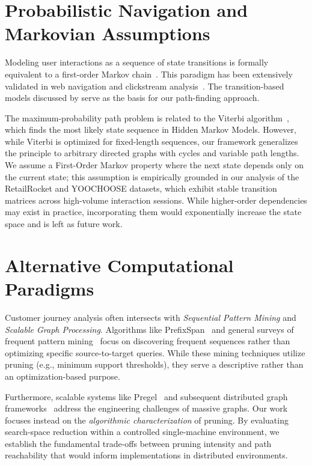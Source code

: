 \section{Probabilistic Navigation and Markovian Assumptions}

Modeling user interactions as a sequence of state transitions is formally equivalent to a first-order Markov chain~\citep{norris1998markov}. This paradigm has been extensively validated in web navigation and clickstream analysis~\citep{bucklin2003clickstream, liu2011webmining}. The transition-based models discussed by \citet{resnick1997recommender} serve as the basis for our path-finding approach.

The maximum-probability path problem is related to the Viterbi algorithm~\citep{viterbi1967error, rabiner1989hmm}, which finds the most likely state sequence in Hidden Markov Models. However, while Viterbi is optimized for fixed-length sequences, our framework generalizes the principle to arbitrary directed graphs with cycles and variable path lengths. We assume a First-Order Markov property where the next state depends only on the current state; this assumption is empirically grounded in our analysis of the RetailRocket and YOOCHOOSE datasets, which exhibit stable transition matrices across high-volume interaction sessions. While higher-order dependencies may exist in practice, incorporating them would exponentially increase the state space and is left as future work.

\section{Alternative Computational Paradigms}

Customer journey analysis often intersects with \emph{Sequential Pattern Mining} and \emph{Scalable Graph Processing}. Algorithms like PrefixSpan~\citep{pei2001prefixspan} and general surveys of frequent pattern mining~\citep{han2007sequential} focus on discovering frequent sequences rather than optimizing specific source-to-target queries. While these mining techniques utilize pruning (e.g., minimum support thresholds), they serve a descriptive rather than an optimization-based purpose.

Furthermore, scalable systems like Pregel~\citep{malewicz2010pregel} and subsequent distributed graph frameworks~\citep{sahu2017scaling} address the engineering challenges of massive graphs. Our work focuses instead on the \emph{algorithmic characterization} of pruning. By evaluating search-space reduction within a controlled single-machine environment, we establish the fundamental trade-offs between pruning intensity and path reachability that would inform implementations in distributed environments.

